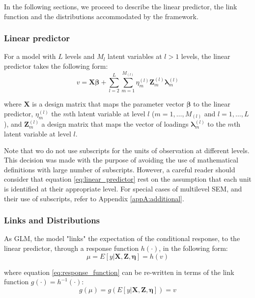 In the following sections, we proceed to describe the linear predictor, the link function and the distributions accommodated by the framework.


\subsubsection{Linear predictor}
For a model with $L$ levels and $M_{l}$ latent variables at $l>1$ levels, the linear predictor takes the following form:
\begin{equation} \label{eq:linear_predictor}
	v = \mathbf{X} \pmb{\beta} + \sum_{l=2}^{L} \sum_{m=1}^{M_{(l)}} \eta_{m}^{(l)} \mathbf{Z}_{m}^{(l)} \pmb{\lambda}_{m}^{(l)}
\end{equation}

\noindent where $\mathbf{X}$ is a design matrix that maps the parameter vector $\pmb{\beta}$ to the linear predictor, $\eta_{m}^{(l)}$ the $m$th latent variable at level $l$ ($m=1, \dots, M_{(l)}$ and $l=1, \dots, L$), and $\mathbf{Z}_{m}^{(l)}$ a design matrix that maps the vector of loadings $\pmb{\lambda}_{m}^{(l)}$ to the $m$th latent variable at level $l$.

Note that wo do not use subscripts for the units of observation at different levels. This decision was made with the purpose of avoiding the use of mathematical definitions with large number of subscripts. However, a careful reader should consider that equation \ref{eq:linear_predictor} rest on the assumption that each unit is identified at their appropriate level. For special cases of multilevel SEM, and their use of subscripts, refer to Appendix \ref{appA:additional}.

\subsubsection{Links and Distributions}
As GLM, the model "links" the expectation of the conditional response, to the linear predictor, through a response function $h(\cdot)$, in the following form: 
\begin{equation} \label{eq:response_function}
	\mu = E[y | \mathbf{X}, \mathbf{Z}, \pmb{\eta}] = h(v)
\end{equation}

\noindent where equation \ref{eq:response_function} can be re-written in terms of the link function $g(\cdot) = h^{-1}(\cdot)$:
\begin{equation} \label{eq:link_function}
	g(\mu) = g(E[y | \mathbf{X}, \mathbf{Z}, \pmb{\eta}]) = v
\end{equation}

